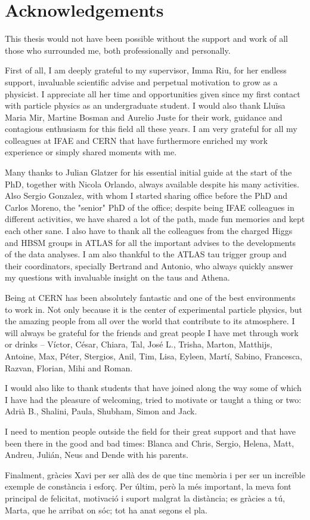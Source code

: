\chapter*{Acknowledgements}

This thesis would not have been possible without the support and work of all those who surrounded me, both
professionally and personally.

First of all, I am deeply grateful to my supervisor, Imma Riu, for her endless support, invaluable scientific advise and perpetual motivation to grow as a physicist. I appreciate all her time and opportunities given since my first contact with particle physics as an undergraduate student. I would also thank Lluïsa Maria Mir, Martine Bosman and Aurelio Juste for their work, guidance and contagious enthusiasm for this field all these years. I am very grateful for all my colleagues at IFAE and CERN that have furthermore enriched my work experience or simply shared moments with me.

Many thanks to Julian Glatzer for his essential initial guide at the start of the PhD, together with Nicola Orlando, always available despite his many activities. Also Sergio Gonzalez, with whom I started sharing office before the PhD and Carlos Moreno, the "senior" PhD of the office; despite being IFAE colleagues in different activities, we have shared a lot of the path, made fun memories and kept each other sane. I also have to thank all the colleagues from the charged Higgs and HBSM groups in ATLAS for all the
important advises to the developments of the data analyses. I am also thankful to the ATLAS tau trigger group and their coordinators, specially Bertrand and Antonio, who always quickly answer my questions with invaluable insight on the taus and Athena.

Being at CERN has been absolutely fantastic and one of the best environments to work in. Not only because it is the center of experimental particle physics, but the amazing people from all over the world that contribute to its atmosphere. I will always be grateful for the friends and great people I have met through work or drinks -- Víctor, César, Chiara, Tal, José L., Trisha, Marton, Matthijs, Antoine, Max, Péter, Stergios, Anil, Tim, Lisa, Eyleen, Martí, Sabino, Francesca, Razvan, Florian, Mihi and Roman.

I would also like to thank students that have joined along the way some of which I have had the pleasure of welcoming, tried to motivate or taught a thing or two: Adrià B., Shalini, Paula, Shubham, Simon and Jack.

I need to mention people outside the field for their great support and that have been there in the good and bad times: Blanca and Chris, Sergio, Helena, Matt, Andreu, Julián, Neus and Dende with his parents.

Finalment, gràcies Xavi per ser allà des de que tinc memòria i per ser un increïble exemple de constància i esforç. Per últim, però la més important, la meva font principal de felicitat, motivació i suport malgrat la distància; es gràcies a tú, Marta, que he arribat on sóc; tot ha anat segons el pla.